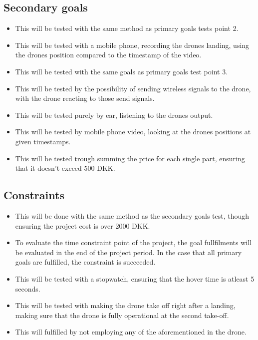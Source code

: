 \documentclass[titlepage,a4paper,11pt]{article}
\begin{document}
\subsection{Secondary goals}
\begin{itemize}
    \item
          This will be tested with the same method as primary goals tests point 2.
    \item
          This will be tested with a mobile phone, recording the drones landing, using the drones position compared to the timestamp of the video.
    \item
          This will be tested with the same goals as primary goals test point 3.
    \item
          This will be tested by the possibility of sending wireless signals to the drone, with the drone reacting to those send signals.
    \item
          This will be tested purely by ear, listening to the drones output.
    \item
          This will be tested by mobile phone video, looking at the drones positions at given timestamps.
    \item
          This will be tested trough summing the price for each single part, ensuring that it doesn’t exceed 500 DKK.
\end{itemize}

\subsection{Constraints}
\begin{itemize}
    \item
          This will be done with the same method as the secondary goals test, though ensuring the project cost is over 2000 DKK.
    \item
          To evaluate the time constraint point of the project, the goal fullfilments will be evaluated in the end of the project period. In the case that all primary goals are fulfilled, the constraint is succeeded.
    \item
          This will be tested with a stopwatch, ensuring that the hover time is atleast 5 seconds.
    \item
          This will be tested with making the drone take off right after a landing, making sure that the drone is fully operational at the second take-off.
    \item
          This will fulfilled by not employing any of the aforementioned in the drone.
\end{itemize}
\end{document}
